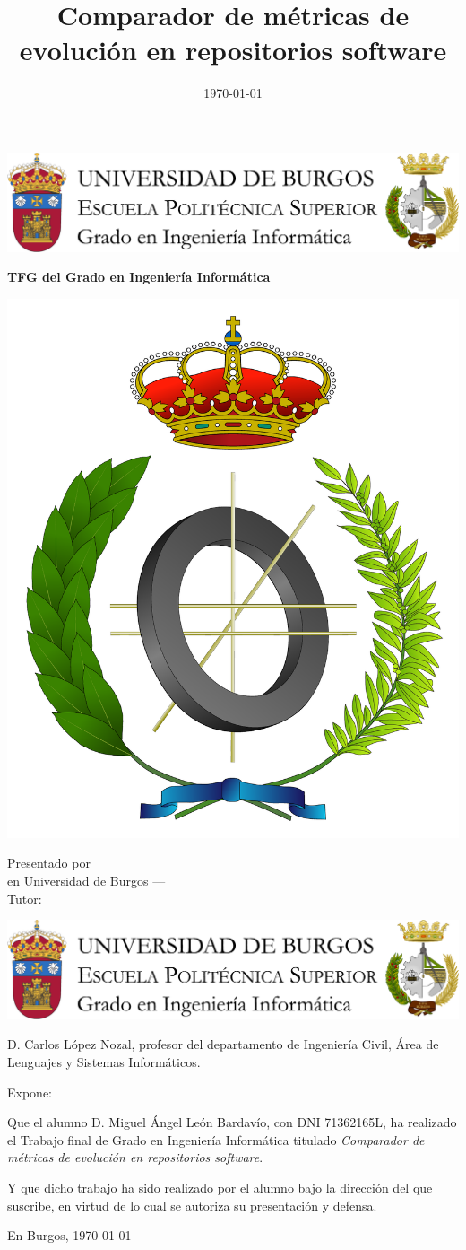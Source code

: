 \documentclass[a4paper,12pt,twoside]{memoir}
\title{Comparador de métricas de evolución en repositorios software}
\author{\nombre}
\date{\today}
\makeatletter
\def\maketitle{
  \null
  \thispagestyle{empty}
\noindent\includegraphics[width=\textwidth]{cabecera}\vspace{1cm}%
  \vfill
  \colorbox{cpardoBox}{%
    \begin{minipage}{.8\textwidth}
      \vspace{.5cm}\Large
      \begin{center}
      \textbf{TFG del Grado en Ingeniería Informática}\vspace{.6cm}\\
      \textbf{\LARGE\@title{}}
      \end{center}
      \vspace{.2cm}
    \end{minipage}

  }%
  \hfill\begin{minipage}{.20\textwidth}
    \includegraphics[width=\textwidth]{escudoInfor}
  \end{minipage}
  \vfill
  \begin{center}%
  {%
    \noindent\LARGE
    Presentado por \@author{}\\ 
    en Universidad de Burgos --- \@date{}\\
    Tutor: \@tutor{}\\
  }%
  \end{center}%
  \null
  \cleardoublepage
  }
\newcommand{\nombre}{Miguel Ángel León Bardavío} %
\makeatother
\begin{document}
\maketitle


\newpage\null\thispagestyle{empty}\newpage


\thispagestyle{empty}


\noindent\includegraphics[width=\textwidth]{cabecera}\vspace{1cm}

\noindent D. Carlos López Nozal, profesor del departamento de Ingeniería Civil, Área de Lenguajes y Sistemas Informáticos.

\noindent Expone:

\noindent Que el alumno D. \nombre, con DNI 71362165L, ha realizado el Trabajo final de Grado en Ingeniería Informática titulado \textit{Comparador de métricas de evolución en repositorios software}. 

\noindent Y que dicho trabajo ha sido realizado por el alumno bajo la dirección del que suscribe, en virtud de lo cual se autoriza su presentación y defensa.

\begin{center} %
En Burgos, {\large \today}
\end{center}

\vfill\vfill\vfill

%
\end{document}
